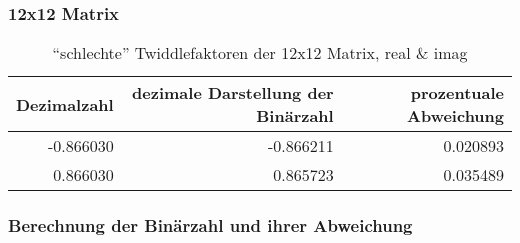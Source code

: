 	\begin{frame}\frametitle{12x12 Matrix}
		\begin{table}[ht]\caption{``schlechte'' Twiddlefaktoren der 12x12 Matrix, real \& imag}
		 \begin{tabular}{rrr}
		  \toprule
		  Dezimalzahl & dezimale Darstellung der Binärzahl & prozentuale Abweichung\\
		  \midrule
		  -0.866030   & -0.866211  & 0.020893\\
		   0.866030   &  0.865723  & 0.035489\\
		   \bottomrule
		 \end{tabular}\label{12x12Matrix}
		\end{table}
	\end{frame}
	
	\begin{frame}\frametitle{Berechnung der Binärzahl und ihrer Abweichung}
	 
	 
	 

	\end{frame}

 
